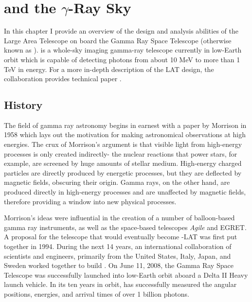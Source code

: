 \chapter[\FermiLAT and the $\gamma$-Ray Sky]{\FermiLAT and the $\gamma$-Ray Sky}
In this chapter I provide an overview of the design and analysis abilities of the Large Area Telescope on board the \Fermi Gamma Ray Space Telescope (otherwise known as \FermiLAT). \FermiLAT is a whole-sky imaging gamma-ray telescope currently in low-Earth orbit which is capable of detecting photons from about 10 MeV to more than 1 TeV in energy. For a more in-depth description of the LAT design, the \FermiLAT collaboration provides technical paper \cite{collaboration_large_2009}. 

\section{History}
The field of gamma ray astronomy begins in earnest with a paper by Morrison in 1958 \cite{morrison_gamma-ray_1958} which lays out the motivation for making astronomical observations at high energies. The crux of Morrison's argument is that visible light from high-energy processes is only created indirectly- the nuclear reactions that power stars, for example, are screened by huge amounts of stellar medium. High-energy charged particles are directly produced by energetic processes, but they are deflected by magnetic fields, obscuring their origin. Gamma rays, on the other hand, are produced directly in high-energy processes and are unaffected by magnetic fields, therefore providing a window into new physical processes. 

Morrison's ideas were influential in the creation of a number of balloon-based gamma ray instruments, as well as the space-based telescopes {\textit {Agile}} and EGRET. A proposal for the telescope that would eventually become \Fermi-LAT was first put together in 1994. During the next 14 years, an international collaboration of scientists and engineers, primarily from the United States, Italy, Japan, and Sweden worked together to build \Fermi. On June 11, 2008, the \Fermi Gamma Ray Space Telescope was successfully launched into low-Earth orbit aboard a Delta II Heavy launch vehicle. In its ten years in orbit, \Fermi has successfully measured the angular positions, energies, and arrival times of over 1 billion photons. 

